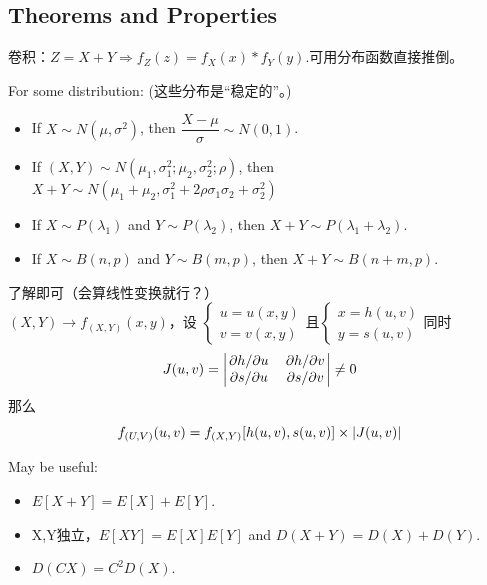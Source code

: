\documentclass{article}
\begin{document}
\subsection{Theorems and Properties}

\begin{thm}
	卷积：$Z=X+Y\Longrightarrow f_Z(z)=f_X(x)*f_Y(y)$.{\color{PineGreen}可用分布函数直接推倒。}
\end{thm}


\begin{prt}
	For some distribution: (这些分布是“稳定的”。)
	\begin{itemize}
		\item 
			If $X\sim N(\mu,\sigma^2)$, then $\dfrac{X-\mu}{\sigma}\sim N(0,1)$.
		\item
			If $(X,Y)\sim 
			N(\mu_1,\sigma_1^2;\mu_2,\sigma_2^2;\rho)$, then $X+Y\sim N(\mu_1+\mu_2,\sigma_1^2+2\rho\sigma_1\sigma_2+\sigma_2^2)$
		\item
			If $X\sim P(\lambda_1)$ and $Y\sim P(\lambda_2)$, then $X+Y\sim P(\lambda_1+\lambda_2)$.
		\item
			If $X\sim B(n,p)$ and $Y\sim B(m,p)$, then $X+Y\sim B(n+m,p)$.
	\end{itemize}
\end{prt}

\newpage
\begin{thm}[*多维随机变量函数的联合分布]
	了解即可（会算线性变换就行？）\\
	$(X,Y)\to f_{(X,Y)}(x,y)$，设
	$
	\begin{cases}
		u=u(x,y)\\
		v=v(x,y)
	\end{cases}
	$且$
	\begin{cases}
		x=h(u,v)\\
		y=s(u,v)
	\end{cases}
	$同时
	\[
		J(u,v)=\mqty| \pdv*{h}{u} & \pdv*{h}{v} \\ \pdv*{s}{u} & \pdv*{s}{v}|\neq 0
	\]
	那么
	\[
		f_{(U,V)}(u,v)=f_{(X,Y)}\qty[h(u,v),s(u,v)]\times\abs{J(u,v)}
	\]
\end{thm}

\begin{prt}[期望，方差]
	May be useful:
	\begin{itemize}
		\item $E[X+Y]=E[X]+E[Y]$.
		\item X,Y独立，$E[XY]=E[X]E[Y]$ and $D(X+Y)=D(X)+D(Y)$.
		\item $D(CX)=C^2D(X)$.
	\end{itemize}
\end{prt}
\end{document}
